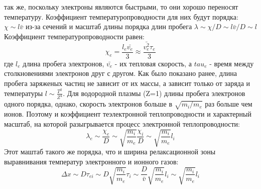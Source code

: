 \documentclass[10pt, a4paper]{article}
\begin{document}
так же, поскольку электроны являются быстрыми, то они хорошо переносят температуру. Коэффициент температуропроводности для них будут порядка: $\chi \sim l\bar{v}$ из-за сечений и масштаб длины порядка длин пробега $\lambda \sim \chi /D \sim l \bar{v}/D \sim l$
Коэффициент температуропроводности равен:
\begin{equation}
	\chi_e=\frac{l_e \bar{v_e}}{3} \approx \frac{\bar{v_e^{2}} \tau_e}{3}
\end{equation} 
где $l_e$ длина пробега электронов, $\bar{v_e}$ - их тепловая скорость, а $tau_e$ - время между столкновениями электронов друг с другом.
Как было показано ранее, длина пробега заряженых частиц не зависит от их массы, а зависит только от заряда и температуры $l \sim \frac{T^{2}}{Z^{4}}$. Для водородной плазмы (Z=1) длины пробега электронов одного порядка, однако, скорость электронов больше в $\sqrt{m_i / m_e}$ раз больше чем ионов. Поэтому и коэффициент теэлектронной теплопроводности и характерный масштаб, на которой разыгрывается процесс электронной теплопроводности:
\begin{equation}
	\lambda_e \sim \frac{\chi_e}{D} \sim \sqrt{\frac{m_i}{m_e}} \frac{\chi_i}{D} \sim \sqrt{\frac{m_i}{m_e}} l_i
\end{equation}
Этот маштаб такого же порядка, что и ширина релаксационной зоны выравнивания температур электронного и ионного газов:
\begin{equation}
	\Delta x \sim D \tau_{ei} \sim D \sqrt{\frac{m_i}{m_e}} \tau_i \sim \frac{D}{\bar{v}} \sqrt{\frac{m_i}{m_e}} l_i \sim \sqrt{\frac{m_i}{m_e}} l_i
\end{equation}
\end{document}
